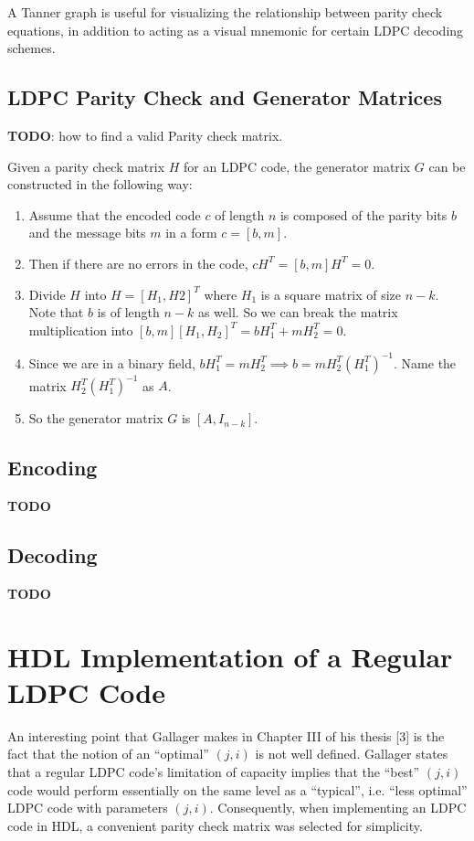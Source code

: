 \documentclass[conference]{IEEEtran}
\begin{document}
A Tanner graph is useful for visualizing the relationship between parity check equations, in addition to acting as a visual mnemonic for certain LDPC decoding schemes.

\subsection{LDPC Parity Check and Generator Matrices}
\textbf{TODO}: how to find a valid Parity check matrix.

Given a parity check matrix $H$ for an LDPC code, the generator matrix $G$ can
be constructed in the following way:
\begin{enumerate}
  \item Assume that the encoded code $c$ of length $n$ is composed of the parity bits
        $b$ and the message bits $m$ in a form $c = [b, m]$.
  \item Then if there are no errors in the code, $cH^T = [b, m]H^T = 0$.
  \item Divide $H$ into $H = [H_1, H2]^T$ where $H_1$ is a square matrix of size $n-k$.
        Note that $b$ is of length $n-k$ as well. So we can break the matrix
        multiplication into $[b, m][H_1, H_2]^T = bH_1^T + mH_2^T = 0$.
  \item Since we are in a binary field, $bH_1^T = mH_2^T \implies b =
          mH_2^T(H_1^T)^{-1}$. Name the matrix $H_2^T(H_1^T)^{-1}$ as $A$.
  \item So the generator matrix $G$ is $[A, I_{n-k}]$.
\end{enumerate}
\subsection{Encoding}
\textbf{TODO}


\subsection{Decoding}
\textbf{TODO}

\section{HDL Implementation of a Regular LDPC Code}
An interesting point that Gallager makes in Chapter III of his thesis [3] is the fact that the notion of an ``optimal'' $(j,i)$ is not well defined.
Gallager states that a regular LDPC code's limitation of capacity implies that the ``best'' $(j,i)$ code would perform essentially on the same level as a ``typical'', i.e. ``less optimal'' LDPC code with parameters $(j,i)$.
Consequently, when implementing an LDPC code in HDL, a convenient parity check matrix was selected for simplicity.
\end{document}
